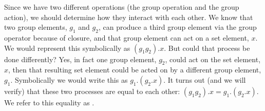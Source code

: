 Since we have two different operations (the group operation and the group action), we should determine how they interact with each other. We know that two group elements, $g_1$ and $g_2$, can produce a third group element via the group operator because of closure, and that group element can act on a set element, $x$. We would represent this symbolically as $(g_1g_2).x$. But could that process be done differently? Yes, in fact one group element, $g_2$, could act on the set element, $x$, then that resulting set element could be acted on by a different group element, $g_1$. Symbolically we would write this as $g_1.(g_2.x)$. It turns out (and we will verify) that these two processes are equal to each other: $(g_1g_2).x=g_1.(g_2.x)$. We refer to this equality as .

